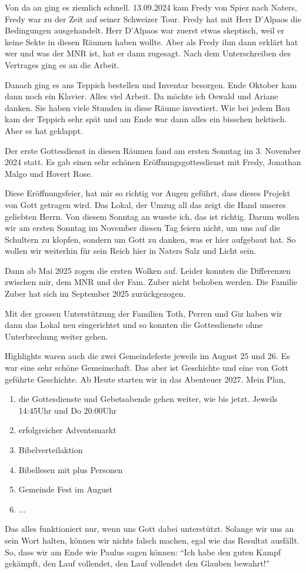 \documentclass[fontsize=14pt]{mybib}
\begin{document}
Von da an ging es ziemlich schnell. 13.09.2024 kam Fredy von Spiez nach Naters, Fredy war zu der Zeit auf seiner Schweizer Tour. Fredy hat mit Herr D'Alpaos die Bedingungen ausgehandelt.  Herr D'Alpaos war zuerst etwas skeptisch, weil er keine Sekte in diesen Räumen haben wollte. Aber als Fredy ihm dann erklärt hat wer und was der MNR ist, hat er dann zugesagt. Nach dem Unterschreiben des Vertrages ging es an die Arbeit.

Danach ging es ans Teppich bestellen und Inventar besorgen. Ende Oktober kam dann noch ein Klavier. Alles viel Arbeit. Da möchte ich Oswald und Ariane danken. Sie haben viele Stunden in diese Räume investiert. Wie bei jedem Bau kam der Teppich sehr spät und am Ende war dann alles ein bisschen hektisch. Aber es hat geklappt.

Der erste Gottesdienst in diesen Räumen fand am ersten Sonntag im 3. November 2024 statt. Es gab einen sehr schönen Eröffnungsgottesdienst mit Fredy, Jonathan Malgo und Hovert Rose.

Diese Eröffnungsfeier, hat mir so richtig vor Augen geführt, dass dieses Projekt von Gott getragen wird. Das Lokal, der Umzug all das zeigt die Hand unseres geliebten Herrn. Von diesem Sonntag an wusste ich, das ist richtig. Darum wollen wir am ersten Sonntag im November diesen Tag feiern nicht, um uns auf die Schultern zu klopfen, sondern um Gott zu danken, was er hier aufgebaut hat. So wollen wir weiterhin für sein Reich hier in Naters Salz und Licht  sein.

Dann ab Mai 2025 zogen die ersten Wolken auf. Leider konnten die Differenzen zwischen mir, dem MNR und der Fam. Zuber nicht behoben werden. Die Familie Zuber hat sich im September 2025 zurückgezogen.

Mit der grossen Unterstützung der Familien Toth, Perren und Giz haben wir dann das Lokal neu eingerichtet und so konnten die Gottesdienste ohne Unterbrechung weiter gehen.

Highlights waren auch die zwei Gemeindefeste jeweils im August 25 und 26. Es war eine sehr schöne Gemeinschaft. Das aber ist Geschichte und eine von Gott geführte Geschichte. Ab Heute starten wir in das Abenteuer 2027. 
Mein Plan, 
\begin{enumerate}
    \item die Gottesdienste und Gebetsabende gehen weiter, wie bis jetzt. Jeweils 14:45Uhr und Do 20:00Uhr
    \item erfolgreicher Adventsmarkt
    \item Bibelverteilaktion
    \item Bibellesen mit plus Personen
    \item Gemeinde Fest im August
    \item ...
\end{enumerate}
Das alles funktioniert nur, wenn uns Gott dabei unterstützt. Solange wir uns an sein Wort halten, können wir nichts falsch machen, egal wie das Resultat ausfällt. So, dass wir am Ende wie Paulus sagen können: \enquote{Ich habe den guten Kampf gekämpft, den Lauf vollendet, den Lauf vollendet den Glauben bewahrt!}
\end{document}
